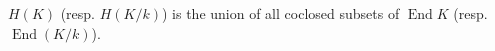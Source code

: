 $H(K)$ (resp. $H(K/k)$) is the union of all coclosed subsets of $\operatorname{End} K$ (resp. $\operatorname{End}(K/k)$).
